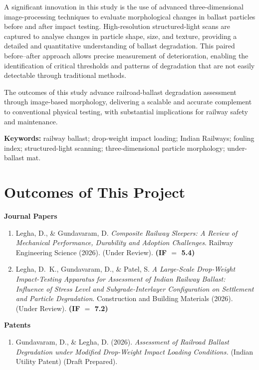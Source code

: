 A significant innovation in this study is the use of advanced three-dimensional image-processing techniques to evaluate morphological changes in ballast particles before and after impact testing. High-resolution structured-light scans are captured to analyse changes in particle shape, size, and texture, providing a detailed and quantitative understanding of ballast degradation. This paired before--after approach allows precise measurement of deterioration, enabling the identification of critical thresholds and patterns of degradation that are not easily detectable through traditional methods.

The outcomes of this study advance railroad-ballast degradation assessment through image-based morphology, delivering a scalable and accurate complement to conventional physical testing, with substantial implications for railway safety and maintenance.

\vspace{0.4cm}
\noindent\textbf{Keywords:} railway ballast; drop-weight impact loading; Indian Railways; fouling index; structured-light scanning; three-dimensional particle morphology; under-ballast mat.

\chapter*{Outcomes of This Project}

\textbf{Journal Papers}
\begin{enumerate}[leftmargin=2em,itemsep=5pt]
  \item Legha, D., \& Gundavaram, D. \emph{Composite Railway Sleepers: A Review of Mechanical Performance, Durability and Adoption Challenges}. Railway Engineering Science (2026). (Under Review). \textbf{(IF $=$ 5.4)}
  \item Legha, D.~K., Gundavaram, D., \& Patel, S. \emph{A Large-Scale Drop-Weight Impact-Testing Apparatus for Assessment of Indian Railway Ballast: Influence of Stress Level and Subgrade-Interlayer Configuration on Settlement and Particle Degradation}. Construction and Building Materials (2026). (Under Review). \textbf{(IF $=$ 7.2)}
\end{enumerate}

\textbf{Patents}
\begin{enumerate}[leftmargin=2em,itemsep=5pt]
  \item Gundavaram, D., \& Legha, D. (2026). \emph{Assessment of Railroad Ballast Degradation under Modified Drop-Weight Impact Loading Conditions.} (Indian Utility Patent) (Draft Prepared).
\end{enumerate}

